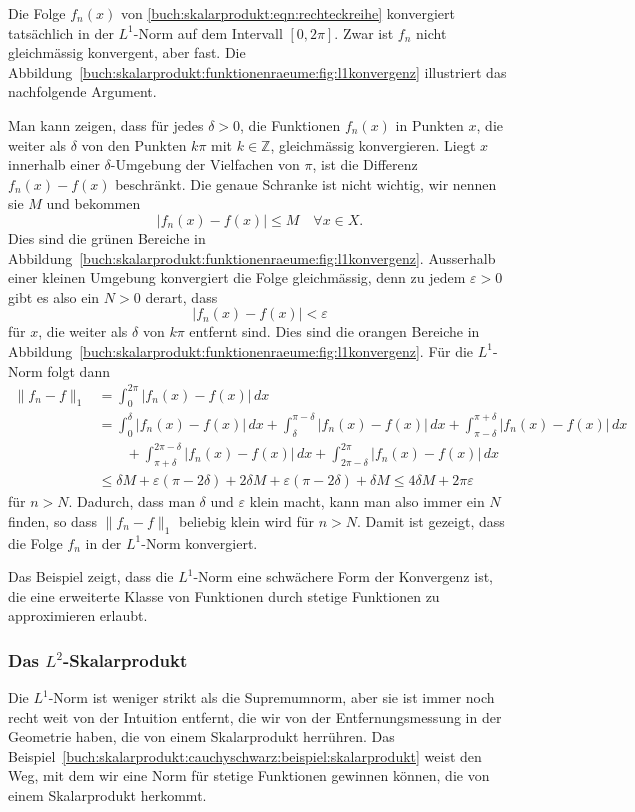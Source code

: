

\begin{beispiel}
Die Folge $f_n(x)$ von \eqref{buch:skalarprodukt:eqn:rechteckreihe}
konvergiert tatsächlich in der $L^1$-Norm auf dem Intervall $[0,2\pi]$.
Zwar ist $f_n$ nicht gleichmässig konvergent, aber fast.
Die Abbildung~\ref{buch:skalarprodukt:funktionenraeume:fig:l1konvergenz}
illustriert das nachfolgende Argument.

Man kann zeigen, dass für jedes $\delta>0$, die Funktionen
$f_n(x)$ in Punkten $x$, die weiter als $\delta$ von den
Punkten $k\pi$ mit $k\in\mathbb{Z}$, gleichmässig konvergieren.
Liegt $x$ innerhalb einer $\delta$-Umgebung der Vielfachen von $\pi$,
ist die Differenz $f_n(x)-f(x)$ beschränkt.
Die genaue Schranke ist nicht wichtig, wir nennen sie $M$ und bekommen
\[
|f_n(x)-f(x)|
\le M
\quad\forall x\in X.
\]
Dies sind die grünen Bereiche in
Abbildung~\ref{buch:skalarprodukt:funktionenraeume:fig:l1konvergenz}.
Ausserhalb einer kleinen Umgebung konvergiert die Folge gleichmässig,
denn zu jedem $\varepsilon>0$ gibt es also ein $N>0$ derart, dass
\[
|f_n(x)-f(x)|<\varepsilon
\]
für $x$, die weiter als $\delta$ von $k\pi$ entfernt sind.
Dies sind die orangen Bereiche in
Abbildung~\ref{buch:skalarprodukt:funktionenraeume:fig:l1konvergenz}.
Für die $L^1$-Norm folgt dann
\begin{align*}
\|f_n-f\|_1
&=
\int_0^{2\pi} |f_n(x)-f(x)|\,dx
\\
&=
\int_0^\delta |f_n(x)-f(x)|\,dx
+
\int_\delta^{\pi-\delta} |f_n(x)-f(x)|\,dx
+
\int_{\pi-\delta}^{\pi+\delta} |f_n(x)-f(x)|\,dx
\\
&\qquad
+
\int_{\pi+\delta}^{2\pi-\delta} |f_n(x)-f(x)|\,dx
+
\int_{2\pi-\delta}^{2\pi} |f_n(x)-f(x)|\,dx
\\
&\le
\delta M
+
\varepsilon (\pi -2\delta)
+
2\delta M
+
\varepsilon (\pi -2\delta)
+
\delta M
\le
4\delta M + 2\pi\varepsilon
\end{align*}
für $n>N$.
Dadurch, dass man $\delta$ und $\varepsilon$ klein macht, kann man
also immer ein $N$ finden, so dass $\|f_n-f\|_1$ beliebig klein wird
für $n>N$.
Damit ist gezeigt, dass die Folge $f_n$ in der $L^1$-Norm konvergiert.
\end{beispiel}

Das Beispiel zeigt, dass die $L^1$-Norm eine schwächere Form der Konvergenz
ist, die eine erweiterte Klasse von Funktionen durch stetige Funktionen
zu approximieren erlaubt.

%
%
\subsubsection{Das $L^2$-Skalarprodukt}
Die $L^1$-Norm ist weniger strikt als die Supremumnorm, aber sie ist
immer noch recht weit von der Intuition entfernt, die wir von der
Entfernungsmessung in der Geometrie haben, die von einem Skalarprodukt
herrühren.
Das Beispiel~\ref{buch:skalarprodukt:cauchyschwarz:beispiel:skalarprodukt}
weist den Weg, mit dem wir eine Norm für stetige Funktionen gewinnen
können, die von einem Skalarprodukt herkommt.

